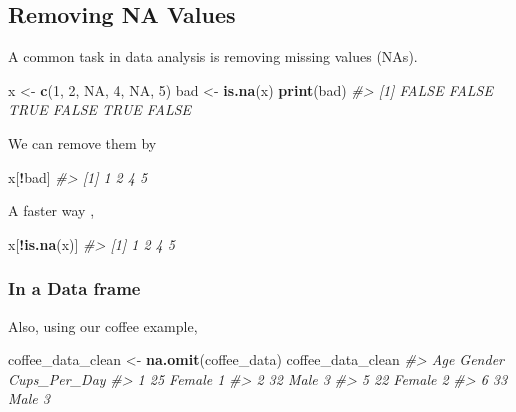\documentclass[
]{book}
\newenvironment{Shaded}{\begin{snugshade}}{\end{snugshade}}
\newcommand{\CommentTok}[1]{\textcolor[rgb]{0.56,0.35,0.01}{\textit{#1}}}
\newcommand{\ConstantTok}[1]{\textcolor[rgb]{0.56,0.35,0.01}{#1}}
\newcommand{\DecValTok}[1]{\textcolor[rgb]{0.00,0.00,0.81}{#1}}
\newcommand{\FunctionTok}[1]{\textcolor[rgb]{0.13,0.29,0.53}{\textbf{#1}}}
\newcommand{\NormalTok}[1]{#1}
\newcommand{\OtherTok}[1]{\textcolor[rgb]{0.56,0.35,0.01}{#1}}
\newcommand{\SpecialCharTok}[1]{\textcolor[rgb]{0.81,0.36,0.00}{\textbf{#1}}}
\begin{document}
\subsection*{Removing NA Values}\label{removing-na-values}

A common task in data analysis is removing missing values (NAs).

\begin{Shaded}
\begin{Highlighting}[]
\NormalTok{x }\OtherTok{\textless{}{-}} \FunctionTok{c}\NormalTok{(}\DecValTok{1}\NormalTok{, }\DecValTok{2}\NormalTok{, }\ConstantTok{NA}\NormalTok{, }\DecValTok{4}\NormalTok{, }\ConstantTok{NA}\NormalTok{, }\DecValTok{5}\NormalTok{)}
\NormalTok{bad }\OtherTok{\textless{}{-}} \FunctionTok{is.na}\NormalTok{(x)}
\FunctionTok{print}\NormalTok{(bad)}
\CommentTok{\#\textgreater{} [1] FALSE FALSE  TRUE FALSE  TRUE FALSE}
\end{Highlighting}
\end{Shaded}

We can remove them by

\begin{Shaded}
\begin{Highlighting}[]
\NormalTok{x[}\SpecialCharTok{!}\NormalTok{bad]}
\CommentTok{\#\textgreater{} [1] 1 2 4 5}
\end{Highlighting}
\end{Shaded}

A faster way ,

\begin{Shaded}
\begin{Highlighting}[]
\NormalTok{x[}\SpecialCharTok{!}\FunctionTok{is.na}\NormalTok{(x)]}
\CommentTok{\#\textgreater{} [1] 1 2 4 5}
\end{Highlighting}
\end{Shaded}

\subsubsection*{In a Data frame}\label{in-a-data-frame}

Also, using our coffee example,

\begin{Shaded}
\begin{Highlighting}[]
\NormalTok{coffee\_data\_clean }\OtherTok{\textless{}{-}} \FunctionTok{na.omit}\NormalTok{(coffee\_data)}
\NormalTok{coffee\_data\_clean}
\CommentTok{\#\textgreater{}   Age Gender Cups\_Per\_Day}
\CommentTok{\#\textgreater{} 1  25 Female            1}
\CommentTok{\#\textgreater{} 2  32   Male            3}
\CommentTok{\#\textgreater{} 5  22 Female            2}
\CommentTok{\#\textgreater{} 6  33   Male            3}
\end{Highlighting}
\end{Shaded}
\end{document}
